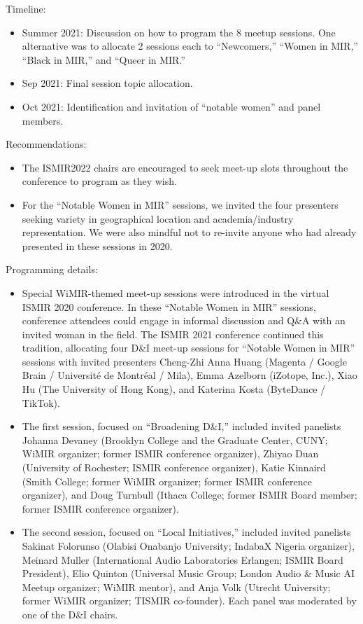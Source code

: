 \documentclass[%
10pt,								%
]
{scrartcl}
\begin{document}
            Timeline:
            \begin{itemize}
                \item   Summer 2021: Discussion on how to program the 8 meetup sessions. One alternative was to allocate 2 sessions each to ``Newcomers,'' ``Women in MIR,'' ``Black in MIR,'' and ``Queer in MIR.''
                \item   Sep 2021: Final session topic allocation.
                \item   Oct 2021: Identification and invitation of ``notable women'' and panel members.
            \end{itemize}

            Recommendations:
            \begin{itemize}
                \item   The ISMIR2022 chairs are encouraged to seek meet-up slots throughout the conference to program as they wish.
                \item   For the ``Notable Women in MIR'' sessions, we invited the four presenters seeking variety in geographical location and academia/industry representation. We were also mindful not to re-invite anyone who had already presented in these sessions in 2020.
            \end{itemize}

            Programming details:
            \begin{itemize}
                \item   Special WiMIR-themed meet-up sessions were introduced in the virtual ISMIR 2020 conference. In these ``Notable Women in MIR'' sessions, conference attendees could engage in informal discussion and Q\&A with an invited woman in the field. The ISMIR 2021 conference continued this tradition, allocating four D\&I meet-up sessions for ``Notable Women in MIR'' sessions with invited presenters Cheng-Zhi Anna Huang (Magenta / Google Brain / Université de Montréal / Mila), Emma Azelborn (iZotope, Inc.), Xiao Hu (The University of Hong Kong), and Katerina Kosta (ByteDance / TikTok).
                \item   The first session, focused on ``Broadening D\&I,'' included invited panelists Johanna Devaney (Brooklyn College and the Graduate Center, CUNY; WiMIR organizer; former ISMIR conference organizer), Zhiyao Duan (University of Rochester; ISMIR conference organizer), Katie Kinnaird (Smith College; former WiMIR organizer; former ISMIR conference organizer), and Doug Turnbull (Ithaca College; former ISMIR Board member; former ISMIR conference organizer). 
                \item   The second session, focused on ``Local Initiatives,'' included invited panelists Sakinat Folorunso (Olabisi Onabanjo University; IndabaX Nigeria organizer), Meinard Muller (International Audio Laboratories Erlangen; ISMIR Board President), Elio Quinton (Universal Music Group; London Audio \& Music AI Meetup organizer; WiMIR mentor), and Anja Volk (Utrecht University; former WiMIR organizer; TISMIR co-founder). Each panel was moderated by one of the D\&I chairs.

            \end{itemize}
\end{document}
